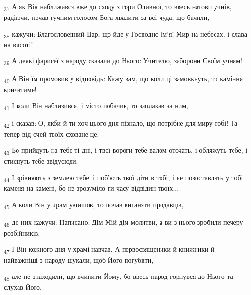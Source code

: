 \begin{tcolorbox}
\textsubscript{37} А як Він наближався вже до сходу з гори Оливної, то ввесь натовп учнів, радіючи, почав гучним голосом Бога хвалити за всі чуда, що бачили,
\end{tcolorbox}
\begin{tcolorbox}
\textsubscript{38} кажучи: Благословенний Цар, що йде у Господнє Ім'я! Мир на небесах, і слава на висоті!
\end{tcolorbox}
\begin{tcolorbox}
\textsubscript{39} А деякі фарисеї з народу сказали до Нього: Учителю, заборони Своїм учням!
\end{tcolorbox}
\begin{tcolorbox}
\textsubscript{40} А Він їм промовив у відповідь: Кажу вам, що коли ці замовкнуть, то каміння кричатиме!
\end{tcolorbox}
\begin{tcolorbox}
\textsubscript{41} І коли Він наблизився, і місто побачив, то заплакав за ним,
\end{tcolorbox}
\begin{tcolorbox}
\textsubscript{42} і сказав: О, якби й ти хоч цього дня пізнало, що потрібне для миру тобі! Та тепер від очей твоїх сховане це.
\end{tcolorbox}
\begin{tcolorbox}
\textsubscript{43} Бо прийдуть на тебе ті дні, і твої вороги тебе валом оточать, і обляжуть тебе, і стиснуть тебе звідусюди.
\end{tcolorbox}
\begin{tcolorbox}
\textsubscript{44} І зрівняють з землею тебе, і поб'ють твої діти в тобі, і не позоставлять у тобі каменя на камені, бо не зрозуміло ти часу відвідин твоїх...
\end{tcolorbox}
\begin{tcolorbox}
\textsubscript{45} А коли Він у храм увійшов, то почав виганяти продавців,
\end{tcolorbox}
\begin{tcolorbox}
\textsubscript{46} до них кажучи: Написано: Дім Мій дім молитви, а ви з нього зробили печеру розбійників.
\end{tcolorbox}
\begin{tcolorbox}
\textsubscript{47} І Він кожного дня у храмі навчав. А первосвященики й книжники й найважніші з народу шукали, щоб Його погубити,
\end{tcolorbox}
\begin{tcolorbox}
\textsubscript{48} але не знаходили, що вчинити Йому, бо ввесь народ горнувся до Нього та слухав Його.
\end{tcolorbox}
